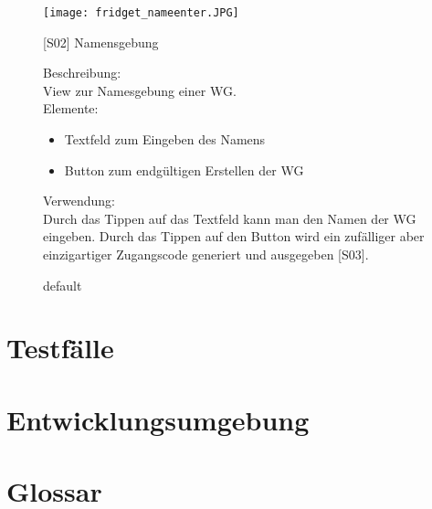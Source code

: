 \documentclass[a4paper]{scrreprt}
\begin{document}
    	\begin{figure}[h!]
    		\begin{minipage}[t]{0.4\linewidth}
    			\flushright
    			\centering
    			\vspace{9mm}
    			\texttt{[image: fridget\_nameenter.JPG]}
    			\caption{default}
    			\label{fig:figure1}
    		\end{minipage}
    		\hspace{0.5cm}
    		\begin{minipage}[t]{0.55\linewidth}
    			\flushleft
    			\vspace{9mm}
    			{[}S02{]} Namensgebung
    			
    			Beschreibung: \\
    			View zur Namesgebung einer WG.
    			\\
    			Elemente:
    			\begin{itemize}
    				\renewcommand\labelitemi{--}
    				\item Textfeld zum Eingeben des Namens
    				\item Button zum endgültigen Erstellen der WG
    				
    			\end{itemize}
    			
    			Verwendung:\\
    			Durch das Tippen auf das Textfeld kann man
    			den Namen der WG eingeben.
    			Durch das Tippen auf den Button wird ein 
    			zufälliger aber einzigartiger Zugangscode 
    			generiert und ausgegeben {[}S03{]}.
    			
    			
    			
    		\end{minipage}
    	\end{figure}

    \chapter{Testfälle}
    
    \chapter{Entwicklungsumgebung}

	\chapter{Glossar}
	
    \glsaddall
    \printglossaries

    \listoffigures
\end{document}
